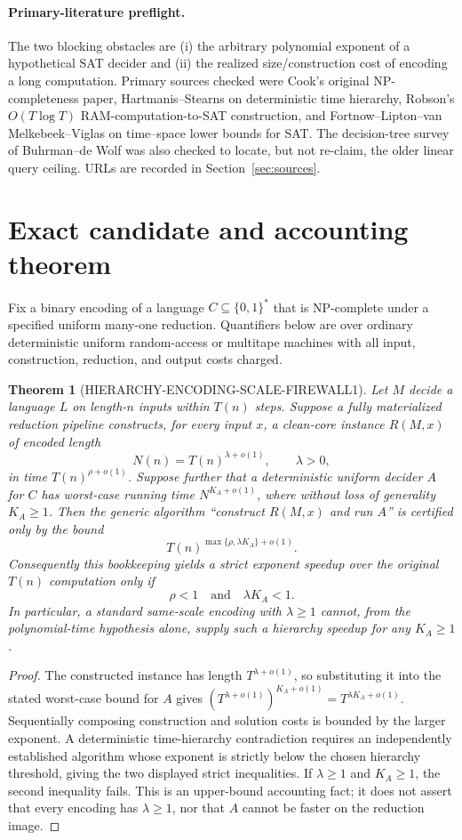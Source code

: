 \documentclass[11pt]{article}
\newtheorem{theorem}{Theorem}
\begin{document}
\paragraph{Primary-literature preflight.}
The two blocking obstacles are (i) the arbitrary polynomial exponent of a
hypothetical SAT decider and (ii) the realized size/construction cost of encoding
a long computation.  Primary sources checked were Cook's original NP-completeness
paper, Hartmanis--Stearns on deterministic time hierarchy, Robson's
$O(T\log T)$ RAM-computation-to-SAT construction, and Fortnow--Lipton--van
Melkebeek--Viglas on time--space lower bounds for SAT.  The decision-tree survey
of Buhrman--de Wolf was also checked to locate, but not re-claim, the older linear
query ceiling.  URLs are recorded in Section~\ref{sec:sources}.

\section{Exact candidate and accounting theorem}
Fix a binary encoding of a language $C\subseteq\{0,1\}^*$ that is NP-complete
under a specified uniform many-one reduction.  Quantifiers below are over ordinary
deterministic uniform random-access or multitape machines with all input,
construction, reduction, and output costs charged.

\begin{theorem}[HIERARCHY-ENCODING-SCALE-FIREWALL1]\label{thm:firewall}
Let $M$ decide a language $L$ on length-$n$ inputs within $T(n)$ steps.  Suppose a
fully materialized reduction pipeline constructs, for every input $x$, a clean-core
instance $R(M,x)$ of encoded length
\[
       N(n)=T(n)^{\lambda+o(1)},\qquad \lambda>0,
\]
in time $T(n)^{\rho+o(1)}$.  Suppose further that a deterministic uniform decider
$A$ for $C$ has worst-case running time $N^{K_A+o(1)}$, where without loss of
generality $K_A\ge 1$.  Then the generic algorithm ``construct $R(M,x)$ and run
$A$'' is certified only by the bound
\[
  T(n)^{\max\{\rho,\lambda K_A\}+o(1)}.
\]
Consequently this bookkeeping yields a strict exponent speedup over the original
$T(n)$ computation only if
\[
           \rho<1 \quad\text{and}\quad \lambda K_A<1.
\]
In particular, a standard same-scale encoding with $\lambda\ge1$ cannot, from the
polynomial-time hypothesis alone, supply such a hierarchy speedup for any
$K_A\ge1$.
\end{theorem}

\begin{proof}
The constructed instance has length $T^{\lambda+o(1)}$, so substituting it into
the stated worst-case bound for $A$ gives
$(T^{\lambda+o(1)})^{K_A+o(1)}=T^{\lambda K_A+o(1)}$.
Sequentially composing construction and solution costs is bounded by the larger
exponent.  A deterministic time-hierarchy contradiction requires an independently
established algorithm whose exponent is strictly below the chosen hierarchy
threshold, giving the two displayed strict inequalities.  If $\lambda\ge1$ and
$K_A\ge1$, the second inequality fails.  This is an upper-bound accounting fact;
it does not assert that every encoding has $\lambda\ge1$, nor that $A$ cannot be
faster on the reduction image.
\end{proof}
\end{document}
